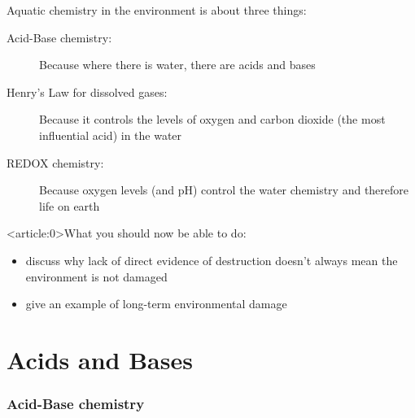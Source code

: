 \documentclass[a4paper,titlepage]{article}
\begin{document}
\begin{frame}{Aquatic chemistry in the environment is about three things: }
\begin{description}
\item[Acid-Base chemistry:] Because where there is water, there are acids and bases
\item[Henry's Law for dissolved gases:] Because it controls the levels of oxygen and carbon dioxide (the most influential acid) in the water %
\item[REDOX chemistry:] Because oxygen levels (and pH) control the water chemistry and therefore life on earth
\end{description}
\end{frame}

\begin{frame}<article:0>{What you should now be able to do:} %
\begin{itemize}
\item discuss why lack of direct evidence of destruction doesn't always mean the environment is not damaged
\item give an example of long-term environmental damage
\end{itemize}
\end{frame}



\part{Acids and Bases}

\section{Acid-Base chemistry}
\end{document}

